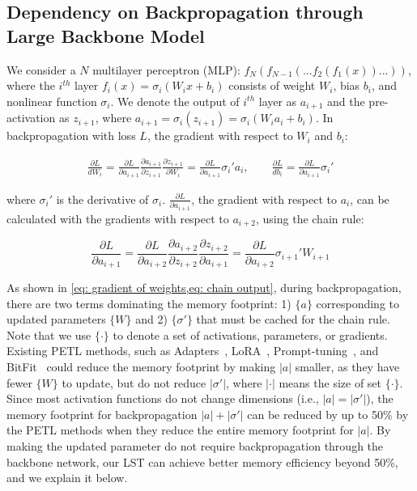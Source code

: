 \subsection{Dependency on Backpropagation through Large Backbone Model}
\label{sec: backpropagation}

We consider a $N$ multilayer perceptron (MLP): $f_N(f_{N-1}(...f_2(f_1( x ))...))$, where the $i^{th}$ layer $f_i(x) = \sigma_i (W_i x + b_i)$ consists of weight $W_i$, bias $b_i$, and nonlinear function $\sigma_i$.
We denote the output of $i^{th}$ layer as $a_{i+1}$ and the pre-activation as $z_{i+1}$, where $a_{i+1} = \sigma_i (z_{i+1}) = \sigma_i (W_i a_{i} + b_i)$. In backpropagation with loss $L$, the gradient with respect to $W_i$ and $b_i$:

\begin{align} \label{eq: gradient of weights}
    \frac{\partial L}{dW_i} = \frac{\partial L}{\partial a_{i+1}}\frac{\partial a_{i+1}}{\partial z_{i+1}}\frac{\partial z_{i+1}}{\partial W_i} =
    \frac{\partial L}{\partial a_{i+1}} \sigma_{i}' a_i , \qquad \frac{\partial L}{db_i} =  \frac{\partial L}{\partial a_{i+1}} \sigma_{i}'
\end{align}

where $\sigma_{i}'$ is the derivative of $\sigma_i$.
$\frac{\partial L}{\partial a_{i+1}}$, the gradient with respect to $a_i$, can be calculated with the gradients with respect to $a_{i+2}$, using the chain rule:

\begin{equation} \label{eq: chain output}
\frac{\partial L}{\partial a_{i+1}} = 
\frac{\partial L}{\partial a_{i+2}}\frac{\partial a_{i+2}}{\partial z_{i+2}}\frac{\partial z_{i+2}}{\partial a_{i+1}} =
\frac{\partial L}{\partial a_{i+2}} \sigma_{i+1}' W_{i+1}
\end{equation}

As shown in \ref{eq: gradient of weights,eq: chain output}, during backpropagation, there are two terms dominating the memory footprint: 1) $\{a\}$ corresponding to updated parameters $\{W\}$ and 2) $\{\sigma'\}$ that must be cached for the chain rule. Note that we use $\{\cdot\}$ to denote a set of activations, parameters, or gradients. Existing PETL methods, such as Adapters~\cite{houlsby2019parameter}, LoRA~\cite{hu2021lora}, Prompt-tuning~\cite{Lester2021ThePO}, and BitFit~\cite{zaken2021bitfit,cai2020tinytl} could reduce the memory footprint by making $|a|$ smaller, as they have fewer $\{W\}$ to update, but do not reduce $|\sigma'|$, where $|\cdot|$ means the size of set $\{\cdot\}$.
Since most activation functions do not change dimensions (i.e., $|a| = |\sigma'|$), the memory footprint for backpropagation $|a| + |\sigma'|$ can be reduced by up to 50\% by the PETL methods when they reduce the entire memory footprint for $|a|$. By making the updated parameter do not require backpropagation through the backbone network, our LST can achieve better memory efficiency beyond 50\%, and we explain it below.

